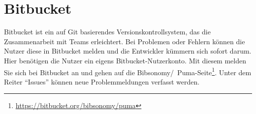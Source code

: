 \section{Bitbucket}
\label{sec:bitbucket}
Bitbucket ist ein auf Git basierendes Versionskontrollsystem, das die Zusammenarbeit mit Teams erleichtert.  
\newline
Bei Problemen oder Fehlern können die Nutzer diese in Bitbucket melden und die Entwickler kümmern sich sofort darum. Hier benötigen die Nutzer ein eigens Bitbucket-Nutzerkonto. Mit diesem melden Sie sich bei Bitbucket an und gehen auf die Bibsonomy/~Puma-Seite\footnote{\url{https://bitbucket.org/bibsonomy/puma}}. Unter dem Reiter \enquote{Issues} können neue Problemmeldungen verfasst werden.
